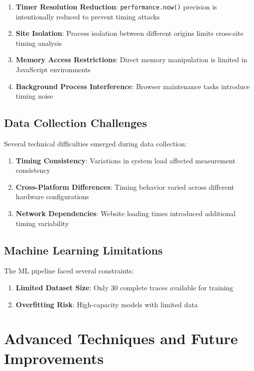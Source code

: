 \documentclass[11pt,a4paper]{article}
\begin{document}
\begin{enumerate}
    \item \textbf{Timer Resolution Reduction}: \texttt{performance.now()} precision is intentionally reduced to prevent timing attacks
    \item \textbf{Site Isolation}: Process isolation between different origins limits cross-site timing analysis
    \item \textbf{Memory Access Restrictions}: Direct memory manipulation is limited in JavaScript environments
    \item \textbf{Background Process Interference}: Browser maintenance tasks introduce timing noise
\end{enumerate}

\subsection{Data Collection Challenges}
Several technical difficulties emerged during data collection:

\begin{enumerate}
    \item \textbf{Timing Consistency}: Variations in system load affected measurement consistency
    \item \textbf{Cross-Platform Differences}: Timing behavior varied across different hardware configurations
    \item \textbf{Network Dependencies}: Website loading times introduced additional timing variability
\end{enumerate}

\subsection{Machine Learning Limitations}
The ML pipeline faced several constraints:

\begin{enumerate}
    \item \textbf{Limited Dataset Size}: Only 30 complete traces available for training
    \item \textbf{Overfitting Risk}: High-capacity models with limited data
\end{enumerate}

\section{Advanced Techniques and Future Improvements}
\end{document}
